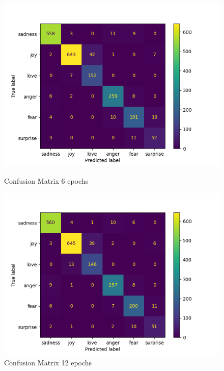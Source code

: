 \begin{figure}[h!]
    \centering
    \begin{minipage}{.5\textwidth}
        \centering
        \includegraphics[width=1\linewidth]{Figures/conf_metrix_roberta_6_epochs.png}
        \caption{Confusion Matrix 6 epochs}
        \label{fig:conf_6_rob}
    \end{minipage}%
    \begin{minipage}{.5\textwidth}
        \centering
        \includegraphics[width=1\linewidth]{Figures/conf_metrix_roberta_12_epochs.png}
        \caption{Confusion Matrix 12 epochs}
        \label{fig:conf_12_rob}
    \end{minipage}
    \begin{minipage}{.5\textwidth}

\end{minipage}
\end{figure}
